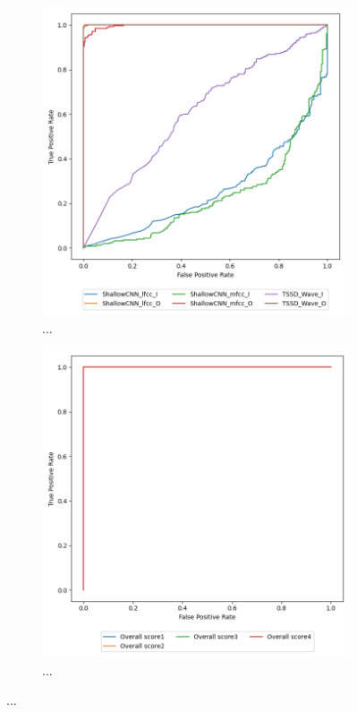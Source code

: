 \begin{figure}[H]
    \begin{subfigure}[h]{0.5\linewidth}
        \centering
        \includegraphics[width=1\linewidth]{other-fig/tests/lj_wf_methods.png}
        \caption{...}
    \end{subfigure}
    \hfill
    \begin{subfigure}[h]{0.5\linewidth}
        \centering
        \includegraphics[width=1\linewidth]{other-fig/tests/lj_wf_overall_score.png}
        \caption{...}
    \end{subfigure}
    \caption{...}
\end{figure}
